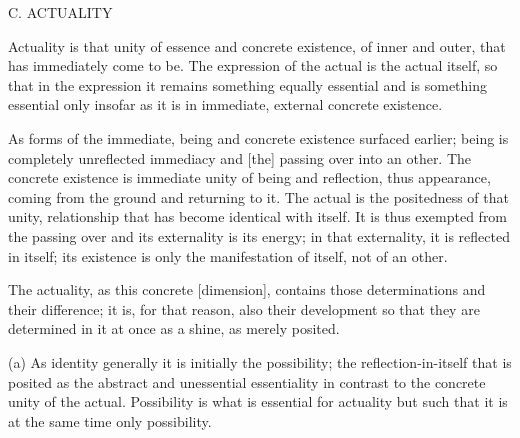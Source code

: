 
C. ACTUALITY

Actuality is that unity of essence and concrete existence,
of inner and outer, that has immediately come to be.
The expression of the actual is the actual itself,
so that in the expression it remains something equally essential
and is something essential only insofar as it is
in immediate, external concrete existence.

As forms of the immediate,
being and concrete existence surfaced earlier;
being is completely unreflected immediacy and
[the] passing over into an other.
The concrete existence is immediate unity of
being and reflection, thus appearance,
coming from the ground and returning to it.
The actual is the positedness of that unity,
relationship that has become identical with itself.
It is thus exempted from the passing over and
its externality is its energy;
in that externality, it is reflected in itself;
its existence is only the manifestation of itself,
not of an other.

The actuality, as this concrete [dimension],
contains those determinations and their difference;
it is, for that reason, also their development
so that they are determined in it at once
as a shine, as merely posited.

(a) As identity generally it is initially the possibility;
the reflection-in-itself that is posited as
the abstract and unessential essentiality
in contrast to the concrete unity of the actual.
Possibility is what is essential for actuality but
such that it is at the same time only possibility.

